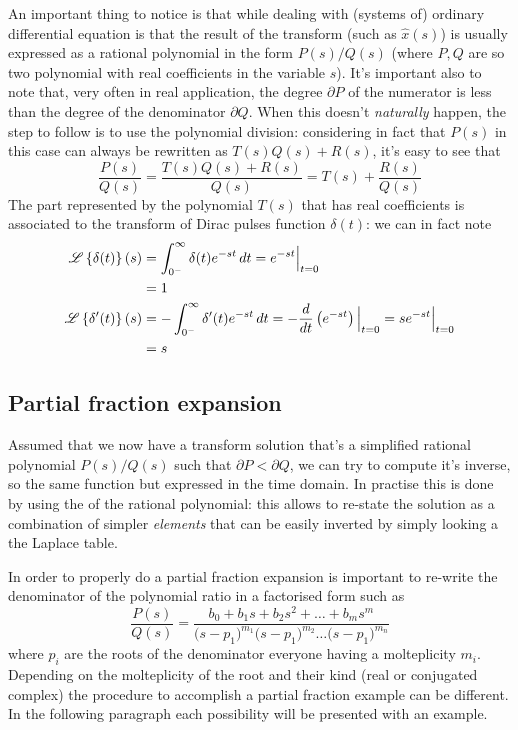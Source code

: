 	An important thing to notice is that while dealing with (systems of) ordinary differential equation is that the result of the transform (such as $\hat x(s)$) is usually expressed as a rational polynomial in the form $P(s)/Q(s)$ (where $P,Q$ are so two polynomial with real coefficients in the variable $s$). It's important also to note that, very often in real application, the degree $\partial P$ of the numerator is less than the degree of the denominator $\partial Q$. When this doesn't \textit{naturally} happen, the step to follow is to use the polynomial division: considering in fact that $P(s)$ in this case can always be rewritten as $T(s)Q(s) + R(s)$, it's easy to see that
	\[ \frac{P(s)}{Q(s)} = \frac{T(s)Q(s) + R(s)}{Q(s)} = T(s) + \frac{R(s)}{Q(s)} \]
	The part represented by the polynomial $T(s)$ that has real coefficients is associated to the transform of Dirac pulses function $\delta(t)$: we can in fact note
	\begin{equation}
		\begin{split}
			\mathscr{L} \left\{ \delta(t) \right\}(s) & = \int_{0^-}^\infty \delta(t) e^{-st}\, dt = e^{-st} \Big|_{t=0} \\ & = 1 \\
			\mathscr{L} \left\{ \delta'(t) \right\}(s) & = -\int_{0^-}^\infty \delta'(t) e^{-st} \, dt = - \frac d {dt} \left(e^{-st}\right) \Big|_{t=0} = s e^ {-st} \Big|_{t=0} \\ & = s
		\end{split}
	\end{equation}

\subsection*{Partial fraction expansion} 
	Assumed that we now have a transform solution that's a simplified rational polynomial $P(s)/Q(s)$ such that $\partial P < \partial Q$, we can try to compute it's inverse, so the same function but expressed in the time domain. In practise this is done by using the  of the rational polynomial: this allows to re-state the solution as a combination of simpler \textit{elements} that can be easily inverted by simply looking a the Laplace table.
	
	In order to properly do a partial fraction expansion is important to re-write the denominator of the polynomial ratio in a factorised form such as
	\[ \frac{P(s)}{Q(s)} = \frac{b_0 + b_1 s + b_2s^2+ \dots + b_ms^m}{\big( s-p_1 \big)^{m_1} \big( s-p_1 \big)^{m_2} \dots \big( s-p_1 \big)^{m_n} } \]
	where $p_i$ are the roots of the denominator everyone having a molteplicity $m_i$. Depending on the molteplicity of the root and their kind (real or conjugated complex) the procedure to accomplish a partial fraction example can be different. In the following paragraph each possibility will be presented with an example.
	
